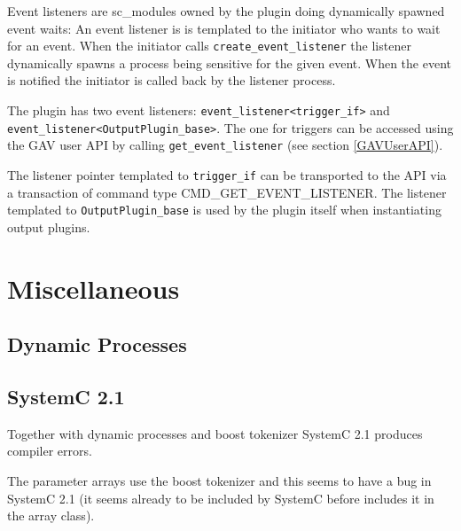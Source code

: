 Event listeners are sc\_modules owned by the plugin doing dynamically spawned event waits: An event listener is is templated to the initiator who wants to wait for an event. When the initiator calls \lstinline|create_event_listener| the listener dynamically spawns a process being sensitive for the given event. When the event is notified the initiator is called back by the listener process.

The plugin has two event listeners:\newline
\lstinline|event_listener<trigger_if>| and \lstinline|event_listener<OutputPlugin_base>|. The one for triggers can be accessed using the GAV user API by calling \lstinline|get_event_listener| (see section \ref{GAVUserAPI}).

The listener pointer templated to \lstinline|trigger_if| can be transported to the API via a transaction of command type {\sffamily \small CMD\_GET\_EVENT\_LISTENER}. The listener templated to \lstinline|OutputPlugin_base| is used by the plugin itself when instantiating output plugins.





\section{Miscellaneous}
\label{GAVMiscellaneous}

\subsection{Dynamic Processes}
\label{GAVDynamicProcesses}



\subsection{SystemC 2.1}
\label{GAVSystemC2.1}

Together with dynamic processes and boost tokenizer SystemC 2.1 produces compiler errors. 

The parameter arrays use the boost tokenizer and this seems to have a bug in SystemC 2.1 (it seems already to be included by SystemC before \GreenAV includes it in the array class).

